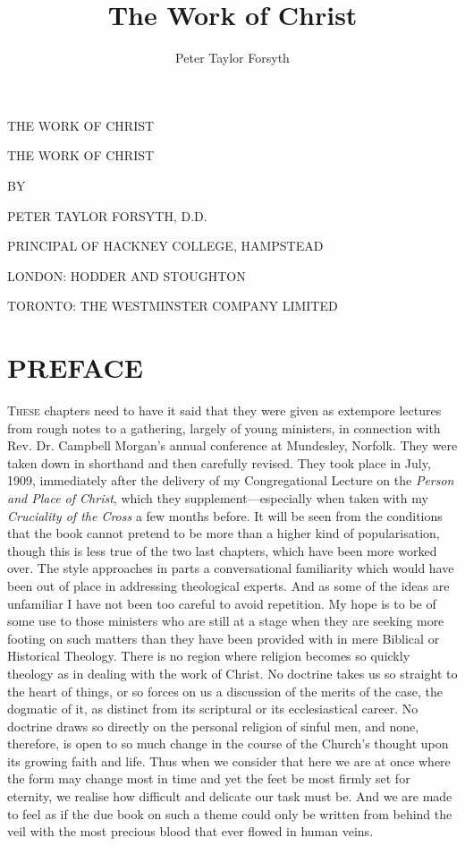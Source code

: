 \documentclass[12pt,letterpaper,oneside]{book}
\author{Peter Taylor Forsyth}
\title{The Work of Christ}
\begin{document}

THE WORK OF CHRIST 




THE WORK OF CHRIST 



BY 

PETER TAYLOR FORSYTH, D.D. 

PRINCIPAL OF HACKNEY COLLEGE, HAMPSTEAD 



LONDON: HODDER AND STOUGHTON 

TORONTO: THE WESTMINSTER COMPANY LIMITED 




\chapter*{PREFACE} 


\textsc{These} chapters need to have it said that 
they were given as extempore lectures 
from rough notes to a gathering, largely of 
young ministers, in connection with Rev. 
Dr. Campbell Morgan's annual conference at 
Mundesley, Norfolk. They were taken down 
in shorthand and then carefully revised. They 
took place in July, 1909, immediately after 
the delivery of my Congregational Lecture on 
the \textit{Person and Place of Christ}, which they 
supplement---especially when taken with my 
\textit{Cruciality of the Cross} a few months before. 
It will be seen from the conditions that the 
book cannot pretend to be more than a 
higher kind of popularisation, though this is 
less true of the two last chapters, which 
have been more worked over. The style approaches 
in parts a conversational familiarity 
which would have been out of place in addressing 
theological experts. And as some of the 
ideas are unfamiliar I have not been too careful 
to avoid repetition. My hope is to be of some 
use to those ministers who are still at a 
stage when they are seeking more footing on 
such matters than they have been provided 
with in mere Biblical or Historical Theology. 
There is no region where religion becomes so 
quickly theology as in dealing with the work 
of Christ. No doctrine takes us so straight 
to the heart of things, or so forces on us a 
discussion of the merits of the case, the dogmatic 
of it, as distinct from its scriptural or 
its ecclesiastical career. No doctrine draws so 
directly on the personal religion of sinful men, 
and none, therefore, is open to so much change 
in the course of the Church's thought upon its 
growing faith and life. Thus when we consider 
that here we are at once where the form may 
change most in time and yet the feet be most 
firmly set for eternity, we realise how difficult 
and delicate our task must be. And we are 
made to feel as if the due book on such a 
theme could only be written from behind the 
veil with the most precious blood that ever 
flowed in human veins. 
\end{document}
